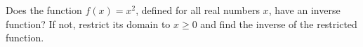 Does the function $f(x)=x^2$, defined for all real numbers $x$, have an inverse function? If not, restrict its domain to $x\ge0$ and find the inverse of the restricted function.
